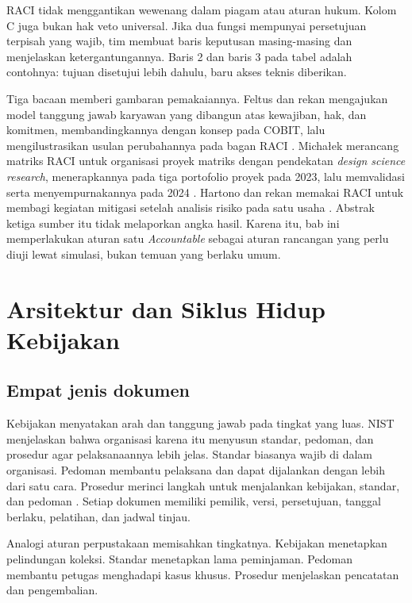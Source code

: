 RACI tidak menggantikan wewenang dalam piagam atau aturan hukum. Kolom C juga bukan hak veto
universal. Jika dua fungsi mempunyai persetujuan terpisah yang wajib, tim membuat baris keputusan
masing-masing dan menjelaskan ketergantungannya. Baris 2 dan baris 3 pada tabel adalah contohnya:
tujuan disetujui lebih dahulu, baru akses teknis diberikan.

Tiga bacaan memberi gambaran pemakaiannya. Feltus dan rekan mengajukan model tanggung jawab
karyawan yang dibangun atas kewajiban, hak, dan komitmen, membandingkannya dengan konsep pada COBIT,
lalu mengilustrasikan usulan perubahannya pada bagan RACI \cite{c08-feltus2009}. Michałek
merancang matriks RACI untuk organisasi proyek matriks dengan pendekatan \textit{design science research}, menerapkannya pada
tiga portofolio proyek pada 2023, lalu memvalidasi serta menyempurnakannya pada 2024
\cite{c08-michalek2026}. Hartono dan rekan memakai RACI untuk membagi kegiatan mitigasi setelah
analisis risiko pada satu usaha \cite{c08-hartono2024}. Abstrak ketiga sumber itu tidak
melaporkan angka hasil. Karena itu, bab ini memperlakukan aturan satu \textit{Accountable} sebagai
aturan rancangan yang perlu diuji lewat simulasi, bukan temuan yang berlaku umum.

\section{Arsitektur dan Siklus Hidup Kebijakan}

\subsection*{Empat jenis dokumen}

Kebijakan menyatakan arah dan tanggung jawab pada tingkat yang luas. NIST menjelaskan bahwa
organisasi karena itu menyusun standar, pedoman, dan prosedur agar pelaksanaannya lebih jelas.
Standar biasanya wajib di dalam organisasi. Pedoman membantu pelaksana dan dapat dijalankan dengan
lebih dari satu cara. Prosedur merinci langkah untuk menjalankan kebijakan, standar, dan pedoman
\cite{c08-nist-sp80012r1}. Setiap dokumen memiliki pemilik, versi, persetujuan, tanggal berlaku,
pelatihan, dan jadwal tinjau.

Analogi aturan perpustakaan memisahkan tingkatnya. Kebijakan menetapkan pelindungan koleksi.
Standar menetapkan lama peminjaman. Pedoman membantu petugas menghadapi kasus khusus. Prosedur
menjelaskan pencatatan dan pengembalian.

